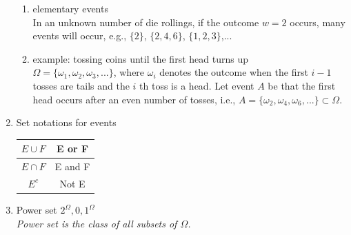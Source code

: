 \documentclass[11pt]{article}
\begin{document}
\begin{enumerate}
\begin{enumerate}
\item elementary events\\
In an unknown number of die rollings, if the outcome $w=2$ occurs, many events will occur, e.g., $\{2\}$, $\{2,4,6\}$, $\{1,2,3\}$,...

\item example: tossing coins until the first head turns up\\
$\Omega = \{\omega _1, \omega _2, \omega _3, ...\}$, where $\omega _i$ denotes the outcome when the first $i-1$ tosses are tails and the $i$ th toss is a head.
Let event $A$ be that the first head occurs after an even number of tosses, i.e., $A = \{\omega _2, \omega _4, \omega _6, ...\} \subset \Omega.$
\end{enumerate}


\item Set notations for events\\
\begin{tabular}{|c|c|}
\hline
$E \cup F$& E or F\\
\hline
$E \cap F$& E and F\\
\hline
$E^{c}$& Not E\\
\hline
\end{tabular}

\item Power set $2^{\Omega}, {0,1}^{\Omega}$\\
\textit{Power set is the class of all subsets of $\Omega$.}


\end{enumerate}
\end{document}
